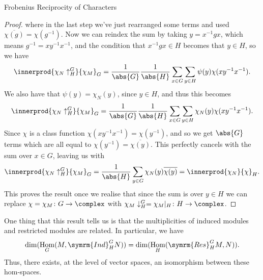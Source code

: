 \documentclass[fleqn]{NotesClass}
\DeclareMathOperator{\Hom}{Hom}
\newcommand{\Res}{\symrm{Res}}
\newcommand{\Ind}{\symrm{Ind}}
\begin{document}
\begin{thm}{Frobenius Reciprocity of Characters}{}
\begin{proof}
            where in the last step we've just rearranged some terms and used \(\overline{\chi(g)} = \chi(g^{-1})\).
            Now we can reindex the sum by taking \(y = x^{-1}gx\), which means \(g^{-1} = xy^{-1}x^{-1}\), and the condition that \(x^{-1}gx \in H\) becomes that \(y \in H\), so we have
            \begin{equation}
                \innerprod{\chi_N\uparrow^G_H}{\chi_M}_G = \frac{1}{\abs{G}} \frac{1}{\abs{H}} \sum_{x \in G} \sum_{y \in H} \psi(y) \chi(xy^{-1}x^{-1}).
            \end{equation}
            We also have that \(\psi(y) = \chi_N(y)\), since \(y \in H\), and thus this becomes
            \begin{equation}
                \innerprod{\chi_N\uparrow^G_H}{\chi_M}_G = \frac{1}{\abs{G}} \frac{1}{\abs{H}} \sum_{x \in G} \sum_{y \in H} \chi_N(y) \chi(xy^{-1}x^{-1}).
            \end{equation}
            Since \(\chi\) is a class function \(\chi(xy^{-1}x^{-1}) = \chi(y^{-1})\), and so we get \(\abs{G}\) terms which are all equal to \(\chi(y^{-1}) = \overline{\chi(y)}\).
            This perfectly cancels with the sum over \(x \in G\), leaving us with
            \begin{equation}
                \innerprod{\chi_N\uparrow^G_H}{\chi_M}_G = \frac{1}{\abs{H}} \sum_{y \in G} \chi_N(y) \overline{\chi(y)} = \innerprod{\chi_N}{\chi}_H.
            \end{equation}
            This proves the result once we realise that since the sum is over \(y \in H\) we can replace \(\chi = \chi_M \colon G \to \complex\) with \(\chi_M\downarrow^G_H = \chi_M|_H \colon H \to \complex\).
        \end{proof}
    \end{thm}
    
    One thing that this result tells us is that the multiplicities of induced modules and restricted modules are related.
    In particular, we have
    \begin{equation}
        \dim(\Hom_G(M, \Ind^G_HN)) = \dim(\Hom_H(\Res^G_HM, N)).
    \end{equation}
    Thus, there exists, at the level of vector spaces, an isomorphism between these hom-spaces.
    
\end{document}
